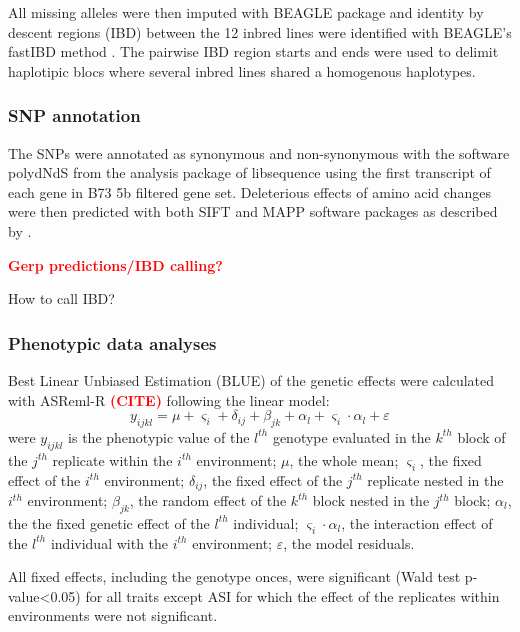 \documentclass[10pt]{article}
\newcommand{\sme}[1]{\textcolor{red}{\bf #1}}
\begin{document}
All missing alleles were then imputed with BEAGLE package \citep{Browning2009} and identity by descent regions (IBD) between the 12 inbred lines were identified with BEAGLE's fastIBD method \citep{Browning2011}. The pairwise IBD region starts and ends were used to delimit haplotipic blocs where several inbred lines shared a homogenous haplotypes.%
\subsubsection*{SNP annotation}

The SNPs were annotated as synonymous and non-synonymous with the software polydNdS from the analysis package of libsequence  \citep{Thornton2003} using the first transcript of each gene in B73 5b filtered gene set. Deleterious effects of amino acid changes were then predicted with both SIFT \citep{Ng2003, Ng2006} and MAPP \citep{Stone2005} software packages as described by \citet{mezmouk2014}.

\sme{Gerp predictions/IBD calling?}

How to call IBD?


\subsubsection*{Phenotypic data analyses}

Best Linear Unbiased Estimation (BLUE) of the genetic effects were calculated with ASReml-R \sme{(CITE)} following the linear model: 
%
\[y_{ijkl} = \mu + \varsigma_{i} + \delta_{ij} + \beta_{jk} + \alpha_{l} +  \varsigma_{i} \cdot \alpha_{l} + \varepsilon\]
%
were 
$y_{ijkl}$ is the phenotypic value of the $l^{th}$ genotype evaluated in the $k^{th}$ block of the $j^{th}$ replicate within the $i^{th}$ environment; 
$\mu$, the whole mean; 
$\varsigma_{i}$, the fixed effect of the $i^{th}$ environment;
$\delta_{ij}$, the fixed effect of the $j^{th}$ replicate nested in the $i^{th}$ environment; 
$\beta_{jk}$, the random effect of the $k^{th}$ block nested in the $j^{th}$ block; 
$\alpha_{l}$, the the fixed genetic effect  of the $l^{th}$ individual; 
$\varsigma_{i} \cdot \alpha_{l}$, the interaction effect of the $l^{th}$ individual with the $i^{th}$ environment; 
$\varepsilon$, the model residuals.

All fixed effects, including the genotype onces, were significant (Wald test p-value<0.05) for all traits except ASI for which the effect of the replicates within environments were not significant.
\end{document}
